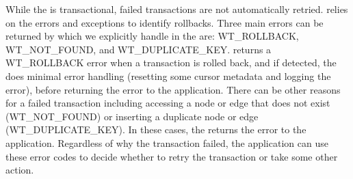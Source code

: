 While the \api{} is transactional, failed transactions are not automatically retried.
\project{} relies on the \wt{} errors and exceptions to identify rollbacks.
Three main errors can be returned by \wt{} which we explicitly handle in the \api{} are: WT\_ROLLBACK, WT\_NOT\_FOUND, and WT\_DUPLICATE\_KEY.
\wt{} returns a WT\_ROLLBACK error when a transaction is rolled back, and if detected, the \api{} does minimal error handling (\eg resetting some cursor metadata and logging the error), before returning the error to the application.
There can be other reasons for a failed transaction including accessing a node or edge that does not exist (WT\_NOT\_FOUND) or inserting a duplicate node or edge (WT\_DUPLICATE\_KEY).
In these cases, the \api{} returns the error to the application.
Regardless of why the transaction failed, the application can use these error codes to decide whether to retry the transaction or take some other action.


